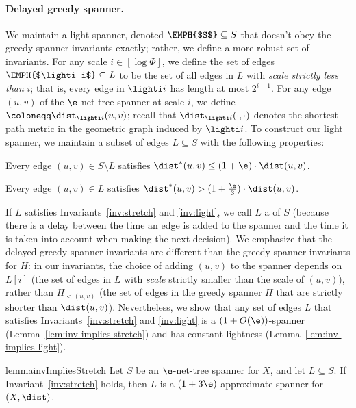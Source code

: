 \paragraph{Delayed greedy spanner.} We maintain a light spanner, denoted $\EMPH{$S$} \subseteq S$
that doesn't obey the greedy spanner invariants exactly; rather, we define a more robust set of invariants. 
For any scale $i \in [\log \Phi]$, we define the set of edges $\EMPH{$\lighti i$}\subseteq L$ to be the set of all edges in $L$ with \emph{scale strictly less than} $i$; that is, every edge in $\lighti i$ has length at most $2^{i-1}$. 
For any edge $(u,v)$ of the $\e$-net-tree spanner at scale $i$, we define $\coloneqq \dist_{\lighti i}(u,v)$; recall that $\dist_{\lighti i}(\cdot, \cdot)$ denotes the shortest-path metric in the geometric graph induced by $\lighti i$.
% 
To construct our light spanner, we maintain a subset of edges $L \subseteq S$ with the following properties:
\begin{invariant}
\label{inv:stretch}
    Every edge $(u,v) \in S \setminus L$ satisfies $\dist^*(u,v) \le (1+\e) \cdot \dist(u,v)$.
\end{invariant}
\begin{invariant}
\label{inv:light}
    Every edge $(u,v) \in L$ satisfies $\dist^*(u,v) > (1+\frac \e 3) \cdot \dist(u,v)$.
\end{invariant}
%
%
If $L$ satisfies Invariants~\ref{inv:stretch} and \ref{inv:light}, we call $L$ a  of $S$
(because there is a delay between the time an edge is added to the spanner and the time it is taken into account when making the next decision). 
We emphasize that the delayed greedy spanner invariants are different than the greedy spanner invariants for $H$: in our invariants, the choice of adding $(u,v)$ to the spanner depends on $L[i]$ (the set of edges in $L$ with \emph{scale} strictly smaller than the scale of $(u,v)$), rather than $H_{<(u,v)}$ (the set of edges in the greedy spanner $H$ that are strictly shorter than $\dist(u,v)$). Nevertheless, we show that any set of edges $L$ that satisfies Invariants~\ref{inv:stretch} and \ref{inv:light} is a $(1+O(\e))$-spanner (Lemma~\ref{lem:inv-implies-stretch}) and has constant lightness (Lemma~\ref{lem:inv-implies-light}). 
% 
\begin{restatable}{lemma}{invImpliesStretch}
    \label{lem:inv-implies-stretch}
Let $S$ be an $\e$-net-tree spanner for $X$, and let $L \subseteq S$. 
If Invariant~\ref{inv:stretch} holds, then $L$ is a $(1+3 \e)$-approximate spanner for $(X, \dist)$.
\end{restatable}
